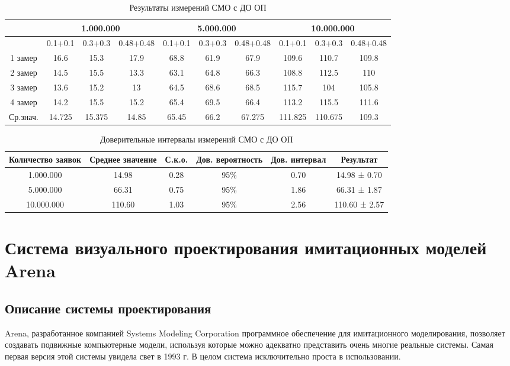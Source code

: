 \documentclass[a4paper,14pt]{report} %
\begin{document}
\begin{table}[h!]
\caption{Результаты измерений СМО с ДО ОП}
\begin{tabular}{|c|c|c|c|c|c|c|c|c|c|}
\hline
 & \multicolumn{3}{|c|}{1.000.000} & \multicolumn{3}{|c|}{5.000.000} & \multicolumn{3}{|c|}{10.000.000} \\
\hline
 & 0.1+0.1 & 0.3+0.3 & 0.48+0.48 & 0.1+0.1 & 0.3+0.3 & 0.48+0.48 & 0.1+0.1 & 0.3+0.3 & 0.48+0.48 \\
\hline
1 замер & 16.6 & 15.3 & 17.9 & 68.8 & 61.9 & 67.9 & 109.6 & 110.7 & 109.8  \\
\hline
2 замер & 14.5 & 15.5 & 13.3 & 63.1 & 64.8 & 66.3 & 108.8 & 112.5 & 110 \\
\hline
3 замер & 13.6 & 15.2 & 13 & 64.5 & 68.6 & 68.5 & 115.7 & 104 & 105.8  \\
\hline
4 замер & 14.2 & 15.5 & 15.2 & 65.4 & 69.5 & 66.4  & 113.2 & 115.5 & 111.6\\
\hline
Ср.знач. &  14.725 & 15.375 & 14.85 & 65.45 & 66.2 & 67.275 & 111.825 & 110.675 & 109.3 \\
\hline
\end{tabular}
\end{table} 

\begin{table}[h!]
\caption{Доверительные интервалы измерений СМО с ДО ОП}
\begin{tabular}{|c|c|c|c|c|c|}
\hline
 Количество заявок & Среднее значение & С.к.о. & Дов. вероятность & Дов. интервал & Результат\\
\hline
1.000.000 & 14.98 & 0.28 & 95\% & 0.70 & 14.98 ± 0.70 \\
\hline
5.000.000 & 66.31 & 0.75 & 95\% & 1.86 & 66.31 ± 1.87 \\
\hline
10.000.000 & 110.60 & 1.03 & 95\% &2.56 & 110.60 ± 2.57 \\
\hline
\end{tabular}
\end{table} 


\section{Система визуального проектирования имитационных моделей Arena}
\subsection{Описание системы проектирования}
Arena, разработанное компанией Systems Modeling Corporation программное обеспечение для имитационного моделирования, позволяет создавать подвижные компьютерные модели, используя которые можно адекватно представить очень многие реальные системы. Самая первая версия этой системы увидела свет в 1993 г. В целом система исключительно проста в использовании. 
\end{document}

